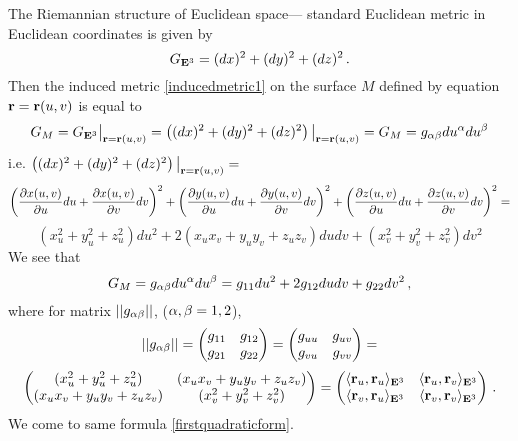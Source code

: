 \documentclass[12pt]{article}
\theoremstyle{theorem}
\numberwithin{equation}{section}
\begin{document}
The  Riemannian structure of Euclidean space---
standard Euclidean metric
in Euclidean coordinates is given by
           \begin{equation}\label{RiemEuclid}
            G_{{\bf E}^3}=(dx)^2+(dy)^2+(dz)^2\,.
           \end{equation}
Then the induced metric \eqref{inducedmetric1} on the surface
$M$ defined by equation ${\bf r}={\bf r}(u,v)$
 is equal to  
       \begin{equation}\label{intermsofdifferentials1}
   G_M= G_{{\bf E}^3}\big\vert_{{\bf r}={\bf r}(u,v)}=\left((dx)^2+(dy)^2+(dz)^2\right)\big\vert_{{\bf r}={\bf r}(u,v)}=
        G_M=g_{\alpha\beta}du^\alpha du^\beta
       \end{equation}
i.e.  $\left((dx)^2+(dy)^2+(dz)^2\right)\big\vert_{{\bf r}={\bf r}(u,v)}=$
          $$
\left({\partial x(u,v)\over \partial u}du+{\partial x(u,v)\over \partial v}dv\right)^2+
\left({\partial y(u,v)\over \partial u}du+{\partial y(u,v)\over \partial v}dv\right)^2+
\left({\partial z(u,v)\over \partial u}du+{\partial z(u,v)\over \partial v}dv\right)^2=
          $$
          $$
(x_u^2+y_u^2+z_u^2)du^2+2(x_ux_v+y_uy_v+z_uz_v)dudv+(x_v^2+y_v^2+z_v^2)dv^2
          $$
          We see that
\begin{equation}\label{firstquadraticform1}
G_M=g_{\alpha\beta}du^\alpha du^\beta=
g_{11}du^2+2g_{12}dudv+g_{22}dv^2\,,
\end{equation}
where for matrix $||g_{\alpha\beta}||$, ($\alpha,\beta=1,2$),  
            $$
||g_{\alpha\beta}||=
\begin{pmatrix}
 g_{11}   &g_{12}\cr
 g_{21}   &g_{22}\cr
\end{pmatrix}
          =
\begin{pmatrix}
 g_{uu}   &g_{uv}\cr
 g_{vu}   &g_{vv}\cr
\end{pmatrix}
       =
              $$
 \begin{equation}\label{firstquadraticform2}
\begin{pmatrix}
 (x_u^2+y_u^2+z_u^2)   &(x_ux_v+y_uy_v+z_uz_v)\cr
    (x_ux_v+y_uy_v+z_uz_v)&(x_v^2+y_v^2+z_v^2) \cr
\end{pmatrix}=
      \begin{pmatrix}
 \langle{\bf r}_u,{\bf r}_u\rangle_{{\bf E}^3}   
&\langle{\bf r}_u,{\bf r}_v\rangle_{{\bf E}^3}\cr
  \langle{\bf r}_v,{\bf r}_u\rangle_{{\bf E}^3}
&\langle{\bf r}_v,{\bf r}_v\rangle_{{\bf E}^3} \cr
\end{pmatrix}\,.
\end{equation}
We come to same formula \eqref{firstquadraticform}.
\end{document}
